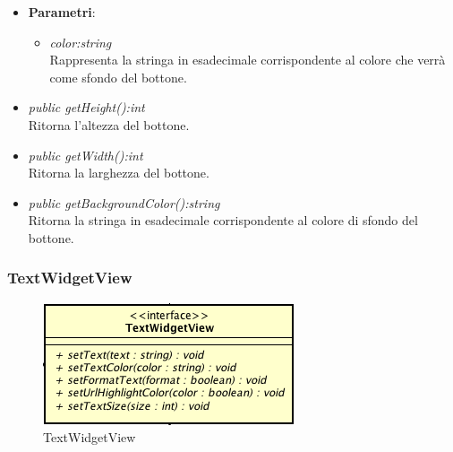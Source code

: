 \begin{itemize}
\begin{itemize}
		\item{\textbf{Parametri}: \begin{itemize}
		\item \textit{color:string}\\
		Rappresenta la stringa in esadecimale corrispondente al colore che verrà come sfondo del bottone.
		\end{itemize}}
	\item \textit{public getHeight():int}\\
	Ritorna l'altezza del bottone.
	\item \textit{public getWidth():int}\\
	Ritorna la larghezza del bottone.
	\item \textit{public getBackgroundColor():string}\\
	Ritorna la stringa in esadecimale corrispondente al colore di sfondo del bottone.
	\end{itemize}
\end{itemize}

\subsubsection{TextWidgetView}

\label{TextWidgetView}
\begin{figure}[ht]
	\centering
	\includegraphics[scale=0.5]{Sezioni/SottosezioniST/img/TextWidgetView.png}
	\caption{TextWidgetView}
\end{figure}

